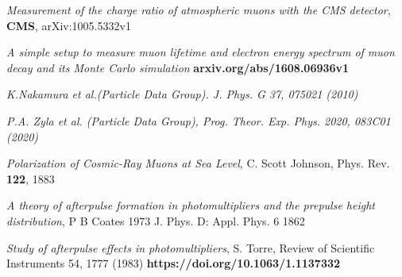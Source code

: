 \documentclass[10pt,a4paper,twocolumn]{article}
\begin{document}
\begin{thebibliography}{9}
 \textit{Measurement of the charge ratio of atmospheric muons with the CMS detector}, \textbf{CMS}, arXiv:1005.5332v1

 \textit{A simple setup to measure muon lifetime and electron energy spectrum of
muon decay and its Monte Carlo simulation} \textbf{arxiv.org/abs/1608.06936v1}

    \textit{K.Nakamura et al.(Particle Data Group). J. Phys. G 37, 075021 (2010)}

    \textit{P.A. Zyla et al. (Particle Data Group), Prog. Theor. Exp. Phys. 2020, 083C01 (2020)}
    
    
    \textit{Polarization of Cosmic-Ray Muons at Sea Level}, C. Scott Johnson, Phys. Rev. \textbf{122}, 1883

    \textit{A theory of afterpulse formation in photomultipliers and the prepulse height distribution}, P B Coates 1973 J. Phys. D: Appl. Phys. 6 1862    

    \textit{Study of afterpulse effects in photomultipliers}, S. Torre, Review of Scientific Instruments 54, 1777 (1983)
    \textbf{https://doi.org/10.1063/1.1137332}

    
\end{thebibliography}
\end{document}
